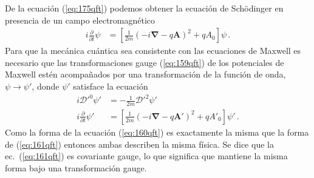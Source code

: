 De la ecuación (\ref{eq:175qft}) podemos obtener la ecuación de Schödinger en presencia de un campo electromagnético
\begin{align}
\label{eq:176qft}
 i\frac{\partial}{\partial t}\psi&=\left[\frac{1}{2m}(-i\mathbf{\nabla}-q\mathbf{A})^2+qA_0\right]\psi\,.
\end{align}
 Para que la mecánica cuántica sea consistente con las ecuaciones de Maxwell es necesario que las transformaciones gauge (\ref{eq:159qft}) de los potenciales de Maxwell estén acompañados por una transformación de la función de onda, $\psi\to\psi'$, donde $\psi'$ satisface la ecuación
\begin{align}
  \label{eq:160qft}
   i{\mathcal{D}'}^0\psi'&=-\frac{1}{2m}{\boldsymbol{\mathcal{D}}'}^2\psi'\nonumber\\
 i\frac{\partial}{\partial t}\psi'&=\left[\frac{1}{2m}(-i\mathbf{\nabla}-q\mathbf{A}')^2+q{A'}_0\right]\psi'\,.
\end{align}
Como la forma de la ecuación (\ref{eq:160qft}) es exactamente la misma que la forma de (\ref{eq:161qft}) entonces ambas describen la misma física. Se dice que  la ec.~(\ref{eq:161qft}) es covariante gauge, lo que significa que mantiene la misma forma bajo una transformación gauge. 

